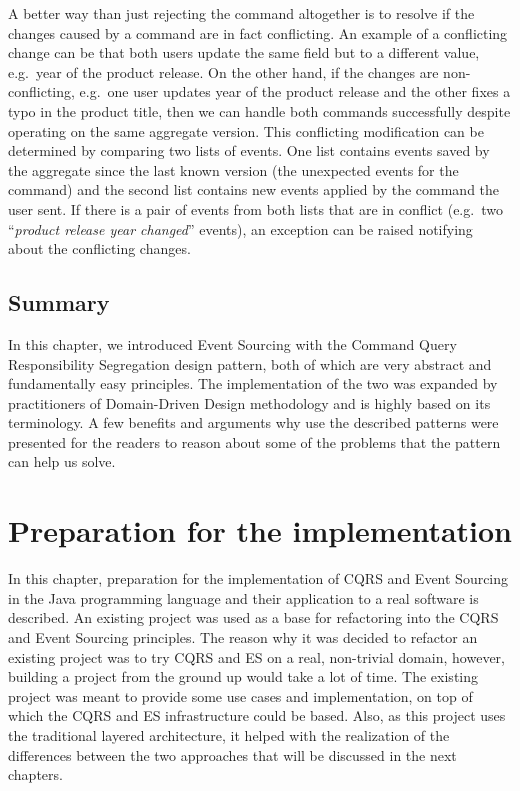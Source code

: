 \documentclass{book}
\begin{document}
A better way than just rejecting the command altogether is to resolve if
the changes caused by a command are in fact conflicting. An example of a
conflicting change can be that both users update the same field but to a
different value, e.g.~year of the product release. On the other hand, if
the changes are non-conflicting, e.g.~one user updates year of the
product release and the other fixes a typo in the product title, then we
can handle both commands successfully despite operating on the same
aggregate version. This conflicting modification can be determined by
comparing two lists of events. One list contains events saved by the
aggregate since the last known version (the unexpected events for the
command) and the second list contains new events applied by the command
the user sent. If there is a pair of events from both lists that are in
conflict (e.g.~two ``\emph{product release year changed}'' events), an
exception can be raised notifying about the conflicting changes.


\subsection{Summary}\label{summary}

In this chapter, we introduced Event Sourcing with the Command Query
Responsibility Segregation design pattern, both of which are very
abstract and fundamentally easy principles. The implementation of the
two was expanded by practitioners of Domain-Driven Design methodology
and is highly based on its terminology. A few benefits and arguments why
use the described patterns were presented for the readers to reason
about some of the problems that the pattern can help us solve.


\section{Preparation for the
implementation}\label{preparation-for-the-implementation}

In this chapter, preparation for the implementation of CQRS and Event
Sourcing in the Java programming language and their application to a
real software is described. An existing project was used as a base for
refactoring into the CQRS and Event Sourcing principles. The reason why
it was decided to refactor an existing project was to try CQRS and ES on
a real, non-trivial domain, however, building a project from the ground
up would take a lot of time. The existing project was meant to provide
some use cases and implementation, on top of which the CQRS and ES
infrastructure could be based. Also, as this project uses the
traditional layered architecture, it helped with the realization of the
differences between the two approaches that will be discussed in the
next chapters.
\end{document}
